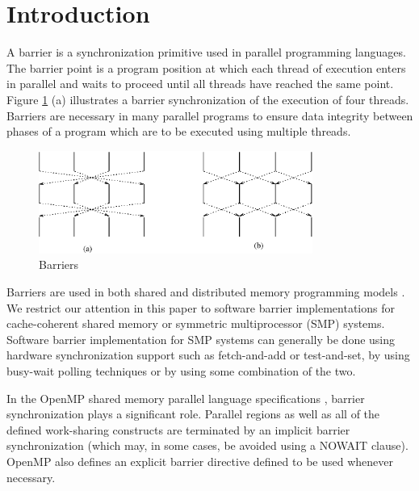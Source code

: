 
\section{Introduction}


A barrier is a synchronization primitive used in parallel programming
languages.  The barrier point is a program position at which each thread
of execution enters in parallel and waits to proceed until all threads
have reached the same point.  Figure \ref{fig:barriers} (a) illustrates a barrier
synchronization of the execution of four threads.  Barriers are necessary in
many parallel programs to ensure data integrity between phases of a program
which are to be executed using multiple threads.

\begin{figure}[hbt]
  \begin{center}
    \includegraphics[angle=0, width=0.8\textwidth]{barriers.eps}
    \caption{Barriers}
    \label{fig:barriers}
  \end{center}
\end{figure}

Barriers are used in both shared and distributed memory programming
models \cite{MPI94} \cite{Sun90} \cite{Kri95}.  We restrict our attention in this paper to software barrier
implementations for cache-coherent shared memory or symmetric
multiprocessor (SMP) systems.  Software barrier implementation for SMP
systems can generally be done using hardware synchronization support such
as fetch-and-add or test-and-set, by using busy-wait polling
techniques or by using some combination of the two.  

In the OpenMP shared memory parallel language specifications\cite{Ope00}\cite{Ope02} , barrier synchronization plays a significant role.  Parallel regions as
well as all of the defined work-sharing constructs are terminated by an
implicit barrier synchronization (which may, in some cases, be avoided using a NOWAIT clause). OpenMP also defines an explicit barrier directive
defined to be used whenever necessary.

